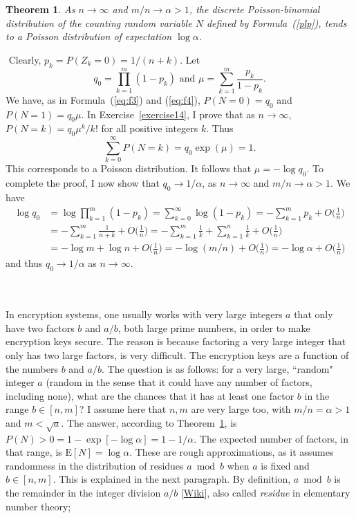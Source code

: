 \documentclass[10pt]{article}
\newtheorem{theorem}{Theorem}[section]
\newenvironment{proof}[1][Proof]{\begin{trivlist}
\item[\hskip \labelsep {\bfseries #1}]}{\end{trivlist}}
\newcommand{\qed}{\nobreak \ifvmode \relax \else
      \ifdim\lastskip<1.5em \hskip-\lastskip
      \hskip1.5em plus0em minus0.5em \fi \nobreak
      \vrule height0.75em width0.5em depth0.25em\fi}
\begin{document}
\begin{theorem}\label{prop1}
As $n\rightarrow\infty$ and $m/n\rightarrow\alpha>1$, the discrete Poisson-binomial distribution of the counting random variable $N$ defined by Formula~(\ref{plp}), tends to a Poisson distribution of expectation $\log\alpha$.
\end{theorem}
\begin{proof}
$ $ \newline
Clearly, $p_k=P(Z_k=0)=1/(n+k)$. Let $$q_0 = \prod_{k=1}^m (1-p_k) \mbox{ and } \mu=\sum_{k=1}^m \frac{p_k}{1-p_k}.$$
We have, as in Formula~(\ref{eq:f3}) and (\ref{eq:f4}), $P(N=0)=q_0$ and $P(N=1)=q_0 \mu$. In Exercise~\ref{exercise14}, I prove that as $n\rightarrow\infty$,
$P(N=k)=q_0 \mu^k/k!$ for all positive integers $k$.  Thus
$$\sum_{k=0}^\infty P(N=k) = q_0\exp(\mu)=1.$$
This corresponds to a Poisson distribution. It follows that $\mu=-\log q_0$. To complete the proof, I now show that $q_0\rightarrow 1/\alpha$, as $n\rightarrow\infty$
 and $m/n\rightarrow \alpha > 1$.
We have
\begin{align}
\log q_0 & = \log \prod_{k=1}^m (1-p_k)  =\sum_{k=0}^\infty \log(1-p_k)  =-\sum_{k=1}^m  p_k +O\Big(\frac{1}{n}\Big)\nonumber\\
& = -\sum_{k=1}^m  \frac{1}{n+k} +O\Big(\frac{1}{n}\Big)  =  -\sum_{k=1}^m  \frac{1}{k} +\sum_{k=1}^{n}  \frac{1}{k}+O\Big(\frac{1}{n}\Big)\nonumber\\
& = -\log m + \log n +O\Big(\frac{1}{n}\Big) = -\log(m/n) + O\Big(\frac{1}{n}\Big)  = -\log\alpha + O\Big(\frac{1}{n}\Big)\nonumber
\end{align}
and thus $q_0 \rightarrow 1/\alpha$ as $n\rightarrow\infty$. \qed
\end{proof}
\quad \\
 \nopagebreak \vspace{1ex} \\
In encryption systems, one usually works with very large integers $a$ that only have two factors $b$ and $a/b$, both large prime numbers, in order to make encryption keys secure. The reason is because factoring a very large integer that only has two large factors, is very difficult. The encryption keys are a function of the numbers $b$ and $a/b$. The question is as follows: for a very large, ``random" integer $a$ (random in the sense that it could have any number of factors, including none), what are the chances that it has at least one factor $b$ in the range $b\in[n, m]$? I assume here that $n,m$ are very large too, with $m/n=\alpha>1$ and $m<\sqrt{a}$. The answer, according to Theorem~\ref{prop1}, is $P(N)>0=1-\exp[-\log \alpha]=1-1/\alpha$. The expected number of factors, in that range, is $\mbox{E}[N] = \log\alpha$. These are rough approximations, as it assumes randomness in the distribution of residues $a \bmod{b}$ when $a$ is fixed and $b\in[n,m]$. This is explained in the next paragraph. By definition, $a \bmod{b}$ is the remainder in the integer division $a/b$ [\href{https://en.wikipedia.org/wiki/Euclidean_division}{Wiki}], also called {\em residue} in elementary number theory;
\end{document}
